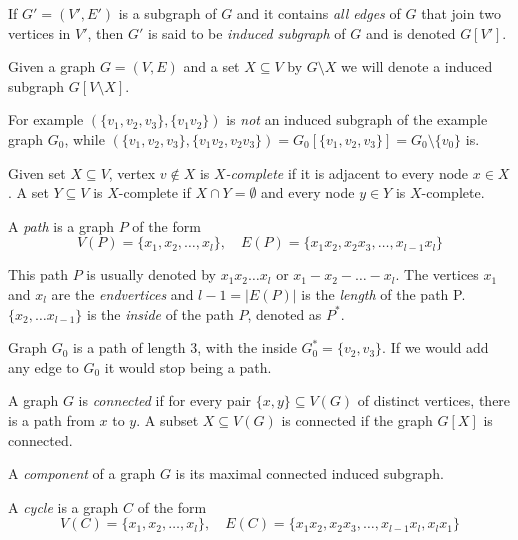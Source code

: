 \begin{defn}
  If $G' = (V', E')$ is a subgraph of $G$ and it contains \emph{all edges} of $G$ that join two vertices in $V'$, then $G'$ is said to be \emph{induced subgraph} of $G$ and is denoted $G[V']$.
\end{defn}

Given a graph $G = (V, E)$ and a set $X \subseteq V$ by $G\setminus X$ we will denote a induced subgraph $G[V\setminus X]$.

For example $(\{v_1, v_2, v_3\}, \{v_1v_2\})$ is \emph{not} an induced subgraph of the example graph $G_0$, while $(\{v_1, v_2, v_3\}, \{v_1v_2, v_2v_3\}) = G_0[\{v_1, v_2, v_3\}] = G_0 \setminus \{v_0\}$ is.

\begin{defn}[$X$-completeness]
  Given set $X \subseteq V$, vertex $v \notin X$ is \emph{$X$-complete} if it is adjacent to every node $x \in X$. A set $Y \subseteq V$ is $X$-complete if $X \cap Y = \emptyset$ and every node $y \in Y$ is $X$-complete.
\end{defn}

\begin{defn}[path]
  A \emph{path} is a graph $P$ of the form
  \[ V(P) = \{x_1, x_2, \ldots, x_l\},\quad E(P) = \{x_1x_2, x_2x_3, \ldots, x_{l-1}x_l\} \]
\end{defn}
This path $P$ is usually denoted by $x_1x_2\ldots x_l$ or $x_1 - x_2 - \ldots - x_l$. The vertices $x_1$ and $x_l$ are the \emph{endvertices} and ${l-1} = |E(P)|$ is the \emph{length} of the path P. $\{x_2, \ldots x_{l-1}\}$ is the \emph{inside} of the path $P$, denoted as $P^*$.

Graph $G_0$ is a path of length 3, with the inside $G_0^* = \{v_2, v_3\}$. If we would add any edge to $G_0$ it would stop being a path.


\begin{defn}
  A graph $G$ is \emph{connected} if for every pair $\{x, y\} \subseteq V(G)$ of distinct vertices, there is a path from $x$ to $y$.
  A subset $X \subseteq V(G)$ is connected if the graph $G[X]$ is connected.
\end{defn}

\begin{defn}[component]
  A \emph{component} of a graph $G$ is its maximal connected induced subgraph.
\end{defn}


\begin{defn}[cycle]
  A \emph{cycle} is a graph $C$ of the form
  \[ V(C) = \{x_1, x_2, \ldots, x_l\},\quad E(C) = \{x_1x_2, x_2x_3, \ldots, x_{l-1}x_l, x_lx_1\} \]
\end{defn}

